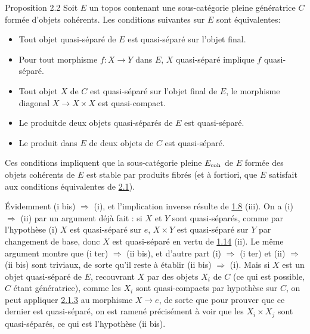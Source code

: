 \documentclass[10pt]{../fichiers-configuration-latex/smfart}
\begin{document}
\begin{enonce*}{Proposition 2.2}
Soit $E$ un topos contenant une sous-catégorie pleine génératrice $C$
formée d'objets cohérents. Les conditions suivantes sur $E$ sont
équivalentes:
\begin{itemize}
\item[(i)] Tout objet quasi-séparé de $E$ est quasi-séparé sur l'objet
  final.

\item[(i bis)] Pour tout morphisme $f : X \to Y$ dans $E$, $X$
  quasi-séparé implique $f$ quasi-séparé.

\item[(i ter)] Tout objet $X$ de $C$ est quasi-séparé sur l'objet final de $E$,
  \ie le morphisme diagonal $X \to X \times X$ est quasi-compact.

\item[(ii)] Le produit\pageoriginale de deux objets quasi-séparés de $E$ est
  quasi-séparé.

\item[(ii bis)] Le produit dans $E$ de deux objets de $C$ est quasi-séparé.
\end{itemize}

Ces conditions impliquent que la sous-catégorie pleine $E_{\mathrm{coh}}$ de
$E$ formée des objets cohérents de $E$ est stable par produits fibrés
(et à fortiori, que $E$ satisfait aux conditions équivalentes de \hyperref[VI.prop2.1]{2.1}).
\end{enonce*}

Évidemment (i bis) $\Rightarrow$ (i), et l'implication inverse
résulte de \hyperref[VI.prop1.8]{1.8} (iii). On a (i) $\Rightarrow$ (ii) par
un argument déjà fait : si $X$ et $Y$ sont quasi-séparés, comme par
l'hypothèse (i) $X$ est quasi-séparé sur $e$, $X \times Y$ est
quasi-séparé sur $Y$ par changement de base, donc $X$ est
quasi-séparé en vertu de \hyperref[VI.prop1.14]{1.14} (ii). Le même argument
montre que (i ter) $\Rightarrow$ (ii bis), et d'autre part (i)
$\Rightarrow$ (i ter) et (ii) $\Rightarrow$ (ii bis) sont triviaux,
de sorte qu'il reste à établir (ii bis) $\Rightarrow$ (i). Mais si
$X$ est un objet quasi-séparé de $E$, recouvrant $X$ par des objets
$X_i$ de $C$ (ce qui est possible, $C$ étant génératrice), comme les
$X_i$ sont quasi-compacts par hypothèse sur $C$, on peut appliquer
\hyperref[VI.lem2.1.3]{2.1.3} au morphisme $X \to e$, de sorte que pour prouver
que ce dernier est quasi-séparé, on est ramené précisément à voir
que les $X_i \times X_j$ sont quasi-séparés, ce qui est l'hypothèse
(ii bis).
\end{document}
